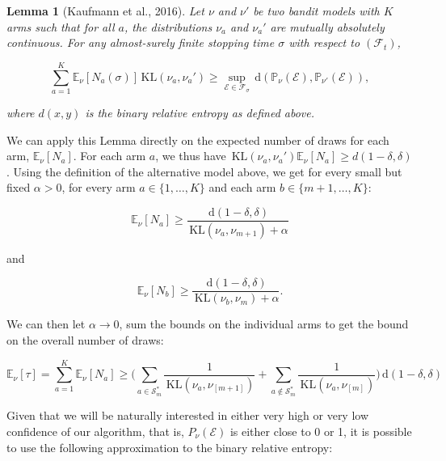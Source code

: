 \documentclass[12pt,]{article}
\newtheorem{lemma}{Lemma}
\newcommand{\KL}{\,\text{KL}}
\newcommand{\der}{\,\text{d}}
\begin{document}
\begin{lemma}[Kaufmann et al., 2016] \label{theorem:KaufmannEtAlLemma1}
Let $\nu$ and $\nu'$ be two bandit models with $K$ arms such that for all $a$, the distributions $\nu_a$ and $\nu_a'$ are mutually absolutely continuous. For any almost-surely finite stopping time $\sigma$ with respect to $(\mathcal{F}_t)$,

\begin{equation*}
\sum_{a=1}^{K} \mathbb{E}_{\nu} [N_a(\sigma)] \KL(\nu_a, \nu_a') \geq \sup_{\mathcal{E} \in \mathcal{F}_{\sigma}} \der (\mathbb{P}_{\nu}(\mathcal{E}), \mathbb{P}_{\nu'}(\mathcal{E})),
\end{equation*}

where $d(x,y)$ is the binary relative entropy as defined above.
\end{lemma}

We can apply this Lemma directly on the expected number of draws for
each arm, \(\mathbb{E}_{\nu}[N_a]\). For each arm \(a\), we thus have
\(\KL(\nu_a, \nu_a') \mathbb{E}_{\nu}[N_a] \geq d(1-\delta, \delta)\).
Using the definition of the alternative model above, we get for every
small but fixed \(\alpha > 0\), for every arm \(a \in \{1, \dots, K\}\)
and each arm \(b \in \{m+1, \dots, K\}\):

\begin{equation*}
\mathbb{E}_{\nu}[N_a] \geq \frac{\der(1-\delta, \delta)}{\KL (\nu_a, \nu_{m+1}) + \alpha}
\end{equation*}

and

\begin{equation*}
\mathbb{E}_{\nu}[N_b] \geq \frac{\der(1-\delta, \delta)}{\KL (\nu_b, \nu_{m}) + \alpha}.
\end{equation*}

We can then let \(\alpha \to 0\), sum the bounds on the individual arms
to get the bound on the overall number of draws:

\begin{equation*}
\mathbb{E}_{\nu}[\tau] = \sum_{a=1}^K \mathbb{E}_{\nu}[N_a] \geq \Big( \sum_{a \in \mathcal{S}_m^*} \frac{1}{\KL(\nu_a, \nu_{[m+1]})} + \sum_{a \notin \mathcal{S}_m^*} \frac{1}{\KL(\nu_a, \nu_{[m]})} \Big) \der(1-\delta, \delta)
\end{equation*}

Given that we will be naturally interested in either very high or very
low confidence of our algorithm, that is, \(P_\nu(\mathcal{E})\) is
either close to 0 or 1, it is possible to use the following
approximation to the binary relative entropy:
\end{document}
